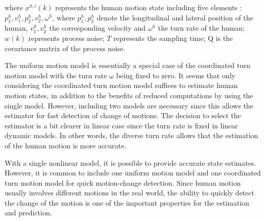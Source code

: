 \documentclass[letterpaper, 10 pt, conference]{ieeeconf}
\begin{document}
	where $x^{h,i}(k)$ represents the human motion state including five elements : $p^h_1,v^h_1,p^h_2,v^h_2,\omega^h$, where $p^h_1,p^h_2$ denote the longitudinal and lateral position of the human, $v^h_1,v^h_2$ the corresponding velocity and $\omega^h$ the turn rate of the human; $w(k)$ represents process noise; $T$ represents the sampling time; Q is the covariance matrix of the process noise.
	
	The uniform motion model is essentially a special case of the coordinated turn motion model with the turn rate $\omega$ being fixed to zero.
	It seems that only considering the coordinated turn motion model suffices to estimate human motion states, in addition to the benefits of reduced computations by using the single model.
	However, including two models are necessary since this allows the estimator for fast detection of change of motions. 
	The decision to select the estimator is a bit clearer in linear case since the turn rate is fixed in linear dynamic models. In other words, the diverse turn rate allows that the estimation of the human motion is more accurate.
	
	With a single nonlinear model, it is possible to provide accurate state estimates. However, it is common to include one uniform motion model and one coordinated turn motion model for quick motion-change detection. 
	Since human motion usually involves different motions in the real world, the ability to quickly detect the change of the motion is one of the important properties for the estimation and prediction.          	
	
	
\end{document}
